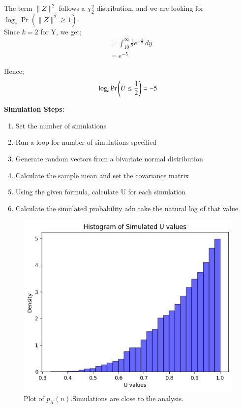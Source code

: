 \documentclass[journal,12pt,onecolumn]{IEEEtran}
\theoremstyle{remark}
\begin{document}
The term $\|Z\|^2$ follows a $\chi^{2}_{2}$ distribution, and we are looking for $\log_e \Pr(\|Z\|^2 \geq 1)$.\\

Since $k=2$ for Y, we get;
\begin{align}
    &= \int_{10}^{\infty} \frac{1}{2}e^{-\frac{y}{2}} \,dy\\
    &= e^{-5}   
\end{align}   

Hence;
\begin{align}
    \log_e \Pr\left(U \le \frac{1}{2}\right) = -5
\end{align}

\textbf{Simulation Steps:}
\begin{enumerate}
    \item Set the number of simulations
    \item Run a loop for number of simulations specified
    \item Generate random vectors from a bivariate normal distribution
    \item Calculate the sample mean and set the covariance matrix
    \item Using the given formula, calculate U for each simulation
    \item Calculate the simulated probability adn take the natural log of that value
\end{enumerate}

\begin{figure}[!ht]
    \centering
    \includegraphics[width=\columnwidth]{./figs/sim.png}
    \caption{Plot of $p_X(n)$.Simulations are close to the analysis. }
    \end{figure}
\end{document}

